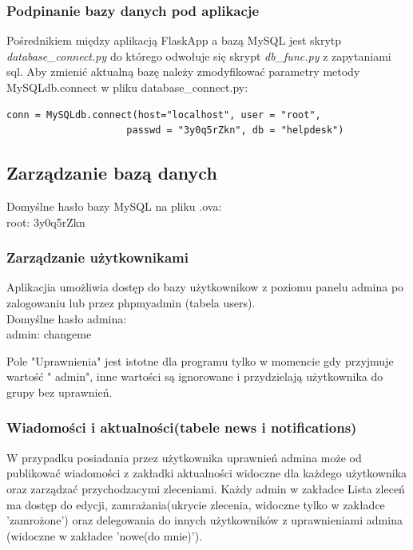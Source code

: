 \documentclass[12pt,a4paper]{article}
\begin{document}
\subsubsection{Podpinanie bazy danych pod aplikacje}
Pośrednikiem między aplikacją FlaskApp a bazą MySQL jest skrytp \textit{database\_connect.py} do którego odwołuje się skrypt \textit{db\_func.py} z zapytaniami sql. Aby zmienić aktualną bazę należy zmodyfikować parametry metody MySQLdb.connect w pliku database\_connect.py:
\begin{lstlisting}
conn = MySQLdb.connect(host="localhost", user = "root",
                     passwd = "3y0q5rZkn", db = "helpdesk")
\end{lstlisting}

\subsection{Zarządzanie bazą danych}
Domyślne hasło bazy MySQL na pliku .ova:\\
root: 3y0q5rZkn

\subsubsection{Zarządzanie użytkownikami}
\quad
Aplikacjia umożliwia dostęp do bazy użytkownikow z poziomu panelu admina po zalogowaniu lub przez phpmyadmin (tabela users). \\

Domyślne hasło admina:\\
admin: changeme

Pole "Uprawnienia" jest istotne dla programu tylko w momencie gdy przyjmuje wartość " admin", inne wartości są ignorowane i przydzielają użytkownika do grupy bez uprawnień.\\

\subsubsection{Wiadomości i aktualności(tabele news i notifications)}
\quad
W przypadku posiadania przez użytkownika uprawnień admina może od publikować wiadomości z zakładki aktualności widoczne dla każdego użytkownika oraz zarządzać przychodzacymi zleceniami.
Każdy admin w zakładce Lista zleceń ma dostęp do edycji, zamrażania(ukrycie zlecenia, widoczne tylko w zakładce 'zamrożone') oraz delegowania do innych użytkowników z uprawnieniami admina (widoczne w zakładce 'nowe(do mnie)').\\
\end{document}
